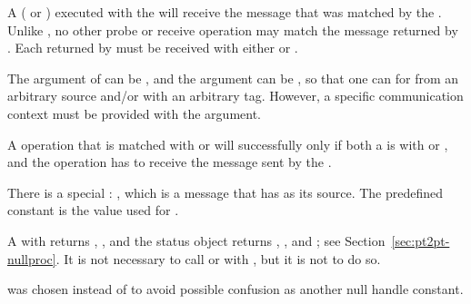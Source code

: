 A  ( or ) executed with the  will receive the
message that was matched by the . Unlike , no
other probe or receive operation may match the message returned by
. Each  returned by  must
be received with either  or .

The  argument of  can be
, and the  argument can be ,
so that one can  for  from an arbitrary source and/or
with an arbitrary tag. However, a specific communication context must
be provided with the  argument.

A  operation that is matched with 
or  will  successfully only if both a 
is  with  or ,
and the  operation has  to receive the message sent by the
.

There is a special : ,
which is a message that has  as its source.
The predefined constant  is the value used for .

A  with \mpicode{ = } returns ,
\mpicode{ = }, and the status object
returns \mpicode{ = }, \mpicode{ = },
and ; see Section~\ref{sec:pt2pt-nullproc}.
It is not necessary to call  or 
with , but it is not  to do so.

\begin{rationale}
 was chosen instead of
to avoid possible confusion as another null handle constant.
\end{rationale}

